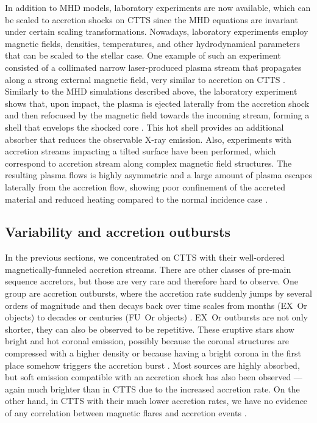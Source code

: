 \documentclass[graybox, nosecnum]{svmult}
\begin{document}
In addition to MHD models, laboratory experiments are now available, which can be scaled to accretion shocks on CTTS since the MHD equations are invariant under certain scaling transformations. Nowadays, laboratory experiments employ magnetic fields, densities, temperatures, and other hydrodynamical parameters that can be scaled to the stellar case. 
One example of such an experiment consisted of a collimated narrow laser-produced plasma stream that propagates along a strong external magnetic field, very similar to accretion on CTTS \cite{Revet_2017}. Similarly to the MHD simulations described above, the laboratory experiment shows
that, upon impact, the plasma is ejected laterally from the accretion shock and then refocused by the magnetic field towards the incoming stream, forming a shell that envelops the shocked core \cite{Revet_2017}. This hot shell provides an additional absorber that reduces the observable  X-ray emission. Also, experiments with accretion streams impacting a tilted surface have been performed, which correspond to accretion stream along complex magnetic field structures. The resulting plasma flows is highly asymmetric and a large amount of plasma escapes laterally from the accretion flow, showing poor confinement of the accreted material and reduced heating compared to the normal
incidence case \cite{Burdonov_2020}.

\subsection{Variability and accretion outbursts}
In the previous sections, we concentrated on CTTS with their well-ordered magnetically-funneled accretion streams. There are other classes of pre-main sequence accretors, but those are very rare and therefore hard to observe. One group are accretion outbursts, where the accretion rate suddenly jumps by several orders of magnitude and then decays back over time scales from months (EX~Or objects) to decades or centuries (FU~Or objects) \cite{2014prpl.conf..387A}. EX~Or outbursts are not only shorter, they can also be observed to be repetitive. These eruptive stars show bright and hot coronal emission, possibly because the coronal structures are compressed with a higher density or because having a bright corona in the first place somehow triggers the accretion burst \cite{2011ApJ...741...83T,2019ApJ...883..117K}. Most sources are highly absorbed, but soft emission compatible with an accretion shock has also been observed \cite{2010A&A...522A..56G}---again much brighter than in CTTS due to the increased accretion rate. 
On the other hand, in CTTS with their much lower accretion rates, we have no evidence of any correlation between magnetic flares and accretion events \cite{1997A&A...324..155G,2019ApJ...876..121E}.
\end{document}
